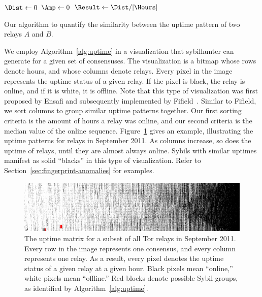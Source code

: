 \begin{algorithm}[t]

\Output{$\Result$}
\BlankLine
$\Dist \leftarrow 0$\;
$\Amp \leftarrow 0$\;
$\Result \leftarrow \Dist / \lvert \Hours \rvert$\;
\caption{Our algorithm to quantify the similarity between the uptime pattern
of two relays $A$ and $B$.}
\label{alg:uptime}
\end{algorithm}

We employ Algorithm~\ref{alg:uptime} in a visualization that sybilhunter can
generate for a given set of consensuses.  The visualization is a bitmap whose
rows denote hours, and whose columns denote relays.  Every pixel in the image
represents the uptime status of a given relay.  If the pixel is black, the relay
is online, and if it is white, it is offline.  Note that this type of
visualization was first proposed by Ensafi and subsequently implemented by
Fifield~\cite{Fifield2014a}.  Similar to Fifield, we sort columns to group
similar uptime patterns together.  Our first sorting criteria is the amount of
hours a relay was online, and our second criteria is the median value of the
online sequence.  Figure~\ref{fig:uptime-matrix} gives an example, illustrating
the uptime patterns for relays in September 2011.  As columns increase, so does
the uptime of relays, until they are almost always online.  Sybils with similar
uptimes manifest as solid ``blacks'' in this type of visualization.  Refer to
Section~\ref{sec:fingerprint-anomalies} for examples.

\begin{figure}[t]
	\centering
	\includegraphics[width=\linewidth]{diagrams/2011-09-uptimes-truncated.jpg}
	\caption{The uptime matrix for a subset of all Tor relays in September 2011.
		Every row in the image represents one consensus, and every column
		represents one relay.  As a result, every pixel denotes the uptime
		status of a given relay at a given hour.  Black pixels mean ``online,''
		white pixels mean ``offline.''  Red blocks denote possible Sybil groups,
		as identified by Algorithm~\ref{alg:uptime}.}
	\label{fig:uptime-matrix}
\end{figure}

